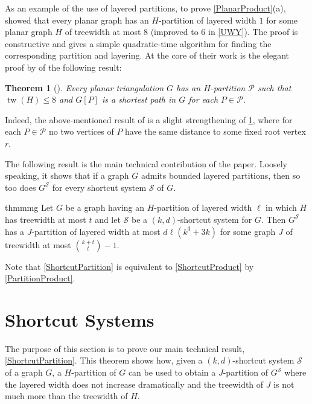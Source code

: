 \documentclass{patmorin}
\theoremstyle{plain}
\newtheorem{thm}{Theorem}
\theoremstyle{definition}
\DeclareMathOperator{\tw}{tw}
\newcommand{\PP}{\mathcal{P}}
\renewcommand{\SS}{\mathcal{S}}
\renewcommand{\leq}{\leqslant}
\begin{document}
As an example of the use of layered partitions, to prove \cref{PlanarProduct}(a),
\citet{DJMMUW20} showed that every planar graph has an $H$-partition of layered width $1$ for some planar graph $H$ of treewidth at most $8$ (improved to $6$ in \cref{UWY}). The proof is constructive and gives a simple quadratic-time algorithm for finding the corresponding partition and layering. At the core of their work is the elegant proof by \citet{PS21} of the following result:

\begin{thm}[\citep{PS21}]
\label{ps}
Every planar triangulation $G$ has an $H$-partition $\PP$
such that $\tw(H)\leq 8$ and $G[P]$ is a shortest path in $G$ for each $P\in\PP$.
\end{thm}

Indeed, the above-mentioned result of \citet{DJMMUW20} is a slight strengthening of \cref{ps}, where for each $P\in\PP$ no two vertices of $P$ have the same distance to some fixed root vertex $r$.

The following result is the main technical contribution of the paper. Loosely speaking, it shows that if a graph $G$ admits bounded layered partitions, then so too does $G^\SS$ for every shortcut system $\SS$ of $G$.

\begin{restatable}{thm}{mmg}
	\label{ShortcutPartition}
	Let $G$ be a graph having an $H$-partition of layered width $\ell$ in which $H$ has treewidth at most $t$ and let $\SS$ be a $(k,d)$-shortcut system for $G$.  Then $G^\SS$ has a $J$-partition of layered width at most $d\ell(k^3+3k)$ for some graph $J$ of treewidth at most $\binom{k+t}{t}-1$.
\end{restatable}

Note that \cref{ShortcutPartition} is equivalent to \cref{ShortcutProduct} by \cref{PartitionProduct}.



\section{Shortcut Systems}
\label{Structure}

The purpose of this section is to prove our main technical result, \cref{ShortcutPartition}. This theorem shows how, given a $(k,d)$-shortcut system $\SS$ of a graph $G$, a $H$-partition of $G$ can be used to obtain a $J$-partition of $G^{\SS}$ where the layered width  does not increase dramatically and the treewidth of $J$ is not much more than the treewidth of $H$.
\end{document}
